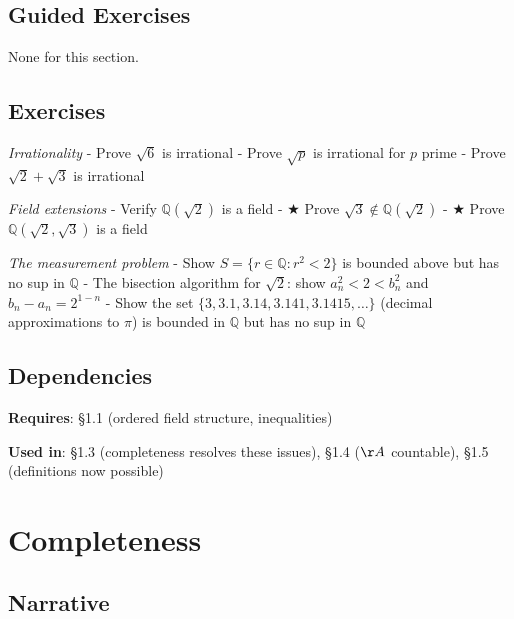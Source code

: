 \documentclass[
  10pt,
  letterpaper,
]{scrbook}
\newcommand{\QQ}{\mathbb{Q}}
\begin{document}
\subsection{Guided Exercises}\label{guided-exercises}

None for this section.

\subsection{Exercises}\label{exercises-1}

\emph{Irrationality} - Prove \(\sqrt{6}\) is irrational - Prove
\(\sqrt{p}\) is irrational for \(p\) prime - Prove
\(\sqrt{2} + \sqrt{3}\) is irrational

\emph{Field extensions} - Verify \(\QQ(\sqrt{2})\) is a field - ★ Prove
\(\sqrt{3} \notin \QQ(\sqrt{2})\) - ★ Prove \(\QQ(\sqrt{2}, \sqrt{3})\)
is a field

\emph{The measurement problem} - Show \(S = \{r \in \QQ : r^2 < 2\}\) is
bounded above but has no sup in \(\QQ\) - The bisection algorithm for
\(\sqrt{2}\): show \(a_n^2 < 2 < b_n^2\) and \(b_n - a_n = 2^{1-n}\) -
Show the set \(\{3, 3.1, 3.14, 3.141, 3.1415, \ldots\}\) (decimal
approximations to \(\pi\)) is bounded in \(\QQ\) but has no sup in
\(\QQ\)

\subsection{Dependencies}\label{dependencies-1}

\textbf{Requires}: §1.1 (ordered field structure, inequalities)

\textbf{Used in}: §1.3 (completeness resolves these issues), §1.4
(\(\AA\) countable), §1.5 (definitions now possible)

\section{Completeness}\label{completeness-1}

\subsection{Narrative}\label{narrative-2}
\end{document}
